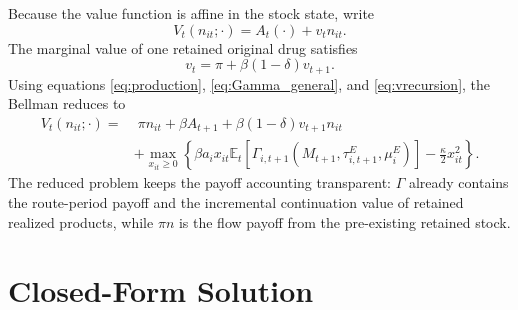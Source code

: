 \documentclass[12pt]{article}
\newcommand{\E}{\mathbb{E}}
\newcommand{\1}{\mathbf{1}}
\begin{document}
Because the value function is affine in the stock state, write
\begin{equation}
    V_t(n_{it};\cdot)=A_t(\cdot)+v_t n_{it}.
    \label{eq:affine}
\end{equation}
The marginal value of one retained original drug satisfies
\begin{equation}
    v_t=\pi+\beta(1-\delta)v_{t+1}.
    \label{eq:vrecursion}
\end{equation}
Using equations \eqref{eq:production}, \eqref{eq:Gamma_general}, and \eqref{eq:vrecursion}, the Bellman reduces to
\begin{align}
V_t(n_{it};\cdot)
=&\; \pi n_{it}+\beta A_{t+1}+\beta(1-\delta)v_{t+1}n_{it} \nonumber\\
&+\max_{x_{it}\ge0}\left\{
\beta a_i x_{it}
\E_t\left[\Gamma_{i,t+1}(M_{t+1},\tau^E_{i,t+1},\mu_i^E)\right]
-\frac{\kappa}{2}x_{it}^2
\right\}.
\label{eq:Bellman_reduced}
\end{align}
The reduced problem keeps the payoff accounting transparent: $\Gamma$ already contains the route-period payoff and the incremental continuation value of retained realized products, while $\pi n$ is the flow payoff from the pre-existing retained stock.

\section{Closed-Form Solution}
\end{document}
